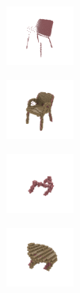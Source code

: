 \begin{figure}[t]
{\begin{subfigure}[t]{0.235\textwidth}
\begin{subfigure}[t]{0.49\textwidth}
        \end{subfigure}
    \end{subfigure}
    \\[2px]
    \begin{subfigure}[t]{0.235\textwidth}
        \begin{subfigure}[t]{0.49\textwidth}
            \vspace{0px}\centering
            \includegraphics[width=2.25cm,trim={3cm 3cm 3cm 3cm},clip]{gfx_intro_modelnet_1452_points}
        \end{subfigure}
        \begin{subfigure}[t]{0.49\textwidth}
            \vspace{0px}\centering
            \includegraphics[width=2.25cm,trim={3cm 3cm 3cm 3cm},clip]{gfx_intro_modelnet_results_1452}
        \end{subfigure}
    \end{subfigure}
    \begin{subfigure}[t]{0.235\textwidth}
        \begin{subfigure}[t]{0.49\textwidth}
            \vspace{0px}\centering
            \includegraphics[width=2.25cm,trim={3cm 3cm 3cm 3cm},clip]{gfx_intro_yang_5_bin_points}
        \end{subfigure}
        \begin{subfigure}[t]{0.49\textwidth}
            \vspace{0px}\centering
            \includegraphics[width=2.25cm,trim={3cm 3cm 3cm 3cm},clip]{gfx_intro_yang_results_5}

\end{subfigure}
\end{subfigure}}
\end{figure}
